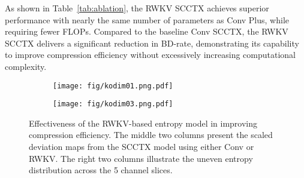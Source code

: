 As shown in Table~\ref{tab:ablation}, the RWKV SCCTX achieves superior performance with nearly the same number of parameters as Conv Plus, while requiring fewer FLOPs. Compared to the baseline Conv SCCTX, the RWKV SCCTX delivers a significant reduction in BD-rate, demonstrating its capability to improve compression efficiency without excessively increasing computational complexity.


\begin{figure*}[h!]
  \centering
    \begin{subfigure}[b]{\textwidth}
        \texttt{[image: fig/kodim01.png.pdf]}
        \label{fig:latent-sub1}
    \end{subfigure}
    \vspace{-6em}
    \begin{subfigure}[b]{\textwidth}
        \texttt{[image: fig/kodim03.png.pdf]}
        \label{fig:latent-sub2}
    \end{subfigure}
    \vspace{4em}
  \caption{Effectiveness of the RWKV-based entropy model in improving compression efficiency. The middle two columns present the scaled deviation maps from the SCCTX model using either Conv or RWKV. The right two columns illustrate the uneven entropy distribution across the 5 channel slices.}
  \label{fig:latent-scale}
\end{figure*}


